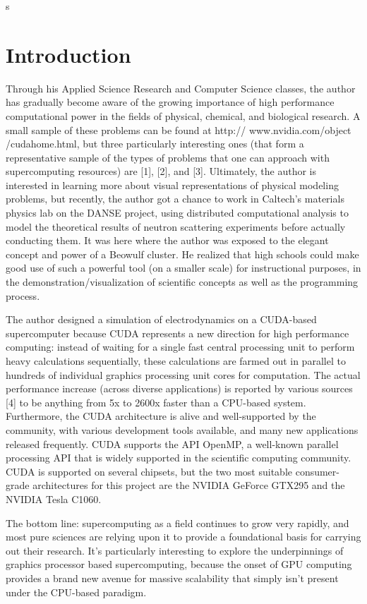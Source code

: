 s\documentclass[10pt]{article}
\begin{document}
\section{Introduction} %
Through his Applied Science Research and Computer Science classes, the author has gradually become aware of the growing importance of high performance computational power in the fields of physical, chemical, and biological research. A small sample of these problems can be found at http:// www.nvidia.com/object /cudahome.html, but three particularly interesting ones (that form a representative sample of the types of problems that one can approach with supercomputing resources) are [1], [2], and [3]. Ultimately, the author is interested in learning more about visual representations of physical modeling problems, but recently, the author got a chance to work in Caltech's materials physics lab on the DANSE project, using distributed computational analysis to model the theoretical results of neutron scattering experiments before actually conducting them. It was here where the author was exposed to the elegant concept and power of a Beowulf cluster. He realized that high schools could make good use of such a powerful tool (on a smaller scale) for instructional purposes, in the demonstration/visualization of scientific concepts as well as the programming process.

The author designed a simulation of electrodynamics on a CUDA-based supercomputer because CUDA represents a new direction for high performance computing: instead of waiting for a single fast central processing unit to perform heavy calculations sequentially, these calculations are farmed out in parallel to hundreds of individual graphics processing unit cores for computation. The actual performance increase (across diverse applications) is reported by various sources [4] to be anything from 5x to 2600x faster than a CPU-based system. Furthermore, the CUDA architecture is alive and well-supported by the community, with various development tools available, and many new applications released frequently. CUDA supports the API OpenMP, a well-known parallel processing API that is widely supported in the scientific computing community. CUDA is supported on several chipsets, but the two most suitable consumer-grade architectures for this project are the NVIDIA GeForce GTX295 and the NVIDIA Tesla C1060. 

The bottom line: supercomputing as a field continues to grow very rapidly, and most pure sciences are relying upon it to provide a foundational basis for carrying out their research. It's particularly interesting to explore the underpinnings of graphics processor based supercomputing, because the onset of GPU computing provides a brand new avenue for massive scalability that simply isn't present under the CPU-based paradigm.
\end{document}
